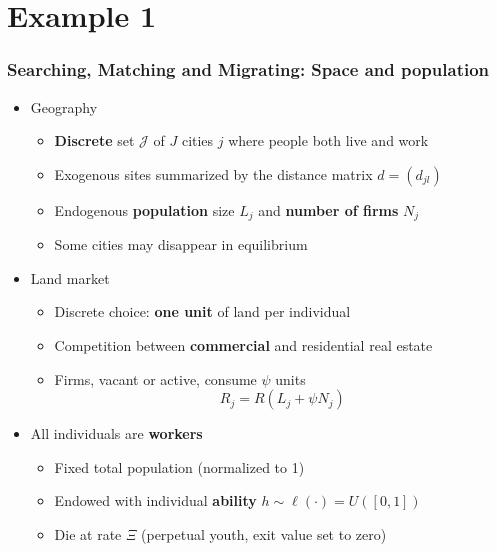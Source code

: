 \documentclass{beamer}
\newcommand{\1}{\mathbb{1}}
\newcommand{\J}{\mathcal{J}}
\begin{document}
\section{Example 1}


\begin{frame}
\frametitle{Searching, Matching and Migrating: Space and population}
\begin{itemize}
\item Geography 
\begin{itemize}
\item \textbf{Discrete} set $\J$ of $J$ cities $j$ where people both live and work
\item Exogenous sites summarized by the distance matrix $d=(d_{jl})$
\item Endogenous\textbf{ population} size $L_j$ and \textbf{number of firms} $N_j$
\item Some cities may disappear in equilibrium
\end{itemize}\bigskip
\item Land market
\begin{itemize}
\item Discrete choice: \textbf{one unit} of land per individual
\item Competition between \textbf{commercial} and residential real estate
\item Firms, vacant or active, consume $\psi$ units
\begin{equation*}
R_j= R(L_j+\psi N_j)
\end{equation*}
\end{itemize}
\item All individuals are \textbf{workers}
\begin{itemize}
\item Fixed total population (normalized to 1)
\item Endowed with individual \textbf{ability} $h\sim \ell(\cdot)=U([0,1])$
\item Die at rate $\Xi$ (perpetual youth, exit value set to zero)
\end{itemize}
\end{itemize}
\end{frame}
\end{document}
